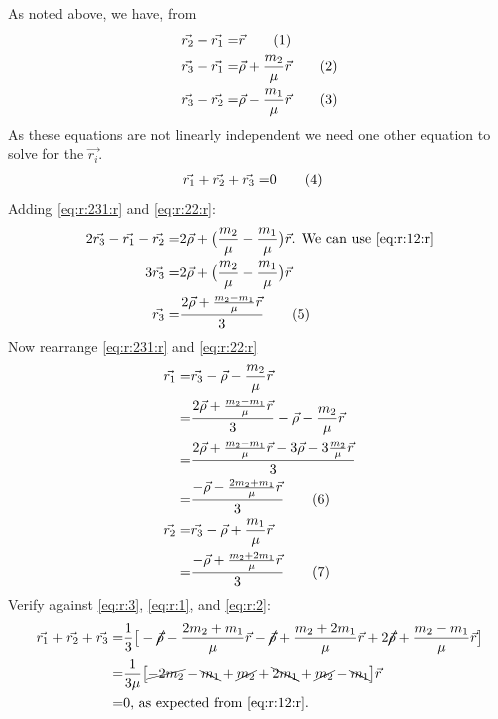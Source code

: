 \documentclass[]{article}
\newcommand\numberthis{\addtocounter{equation}{1}\tag{\theequation}}
\begin{document}
As noted above, we have, from  \cite[(27a,b,c)]{kotovych2002exactly}
\begin{align*}
	\vec{r_2} - \vec{r_1} =& \vec{r} \numberthis \label{eq:r:21:r}\\
	\vec{r_3} - \vec{r_1} =& \vec{\rho} + \frac{m_2}{\mu}\vec{r} \numberthis \label{eq:r:231:r} \\
	\vec{r_3} - \vec{r_2} =& \vec{\rho} - \frac{m_1}{\mu}\vec{r} \numberthis \label{eq:r:22:r}
\end{align*}
As these equations are not linearly independent we need one other equation to solve for the $\vec{r_i}$.
\begin{align*}
	\vec{r_1} + \vec{r_2} +\vec{r_3} =& 0 \numberthis \label{eq:r:12:r}
\end{align*}
Adding \eqref{eq:r:231:r} and \eqref{eq:r:22:r}:
\begin{align*}
	2\vec{r_3} - \vec{r_1} - \vec{r_2} =& 2 \vec{\rho} + \big(\frac{m_2}{\mu} - \frac{m_1}{\mu}\big)\vec{r} \text{. We can use \eqref{eq:r:12:r}}\\
	3 \vec{r_3} =& 2 \vec{\rho} + \big(\frac{m_2}{\mu} - \frac{m_1}{\mu}\big)\vec{r}\\
	\vec{r_3} =& \frac{2 \vec{\rho} + \frac{m_2-m_1}{\mu} \vec{r}}{3} \numberthis \label{eq:r:3}
\end{align*}
Now rearrange \eqref{eq:r:231:r} and \eqref{eq:r:22:r}
\begin{align*}
	\vec{r_1} =& \vec{r_3}  -\vec{\rho} - \frac{m_2}{\mu}\vec{r}  \\
	=& \frac{2 \vec{\rho} + \frac{m_2 - m_1}{\mu} \vec{r}}{3} -\vec{\rho} - \frac{m_2}{\mu}\vec{r}\\
	=& \frac{2 \vec{\rho} + \frac{m_2 - m_1}{\mu} \vec{r}  -3\vec{\rho} - 3\frac{m_2}{\mu}\vec{r}}{3}\\
	=& \frac{ -\vec{\rho} - \frac{2 m_2+m_1}{\mu} \vec{r}}{3} \numberthis \label{eq:r:1}\\
	\vec{r_2} =& \vec{r_3}  -\vec{\rho} + \frac{m_1}{\mu}\vec{r}\\
	=& \frac{- \vec{\rho} + \frac{m_2+2m_1}{\mu} \vec{r}}{3}  \numberthis \label{eq:r:2}
\end{align*}
Verify against \eqref{eq:r:3}, \eqref{eq:r:1}, and \eqref{eq:r:2}:
\begin{align*}
	\vec{r_1} + \vec{r_2} + \vec{r_3} =& \frac{1}{3} \big[-\cancel{\vec{\rho}} - \frac{2 m_2+m_1}{\mu} \vec{r} - \cancel{\vec{\rho} }+ \frac{m_2+2m_1}{\mu} \vec{r} + 2 \cancel{\vec{\rho}} + \frac{m_2-m_1}{\mu} \vec{r}\big] \\
	=& \frac{1}{3\mu} \big[ \cancel{-2 m_2}-\bcancel{m_1}  + \cancel{m_2}+\bcancel{2m_1}  +  \cancel{m_2}-\bcancel{m_1} \big] \vec{r}\\
	=& 0 \text{, as expected from \eqref{eq:r:12:r}}.
\end{align*}
\end{document}

